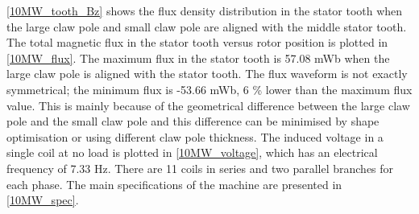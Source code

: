 \documentclass[12pt]{iopart}
\begin{document}
\ref{10MW_tooth_Bz} shows the flux density distribution in the stator tooth when the large claw pole and small claw pole are aligned with the middle stator tooth.
The total magnetic flux in the stator tooth versus rotor position is plotted in \ref{10MW_flux}.
The maximum flux in the stator tooth is 57.08 mWb when the large claw pole is aligned with the stator tooth. The flux waveform is not exactly symmetrical; the minimum flux is -53.66 mWb, 6 \% lower than the maximum flux value. This is mainly because of the geometrical difference between the large claw pole and the small claw pole and this difference can be minimised by shape optimisation or using different claw pole thickness. The induced voltage in a single coil at no load is plotted in \ref{10MW_voltage}, which has an electrical frequency of 7.33 Hz. There are 11 coils in series and two parallel branches for each phase. The main specifications of the machine are presented in \ref{10MW_spec}.
\end{document}

